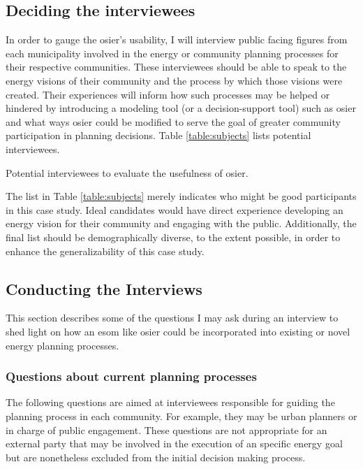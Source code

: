 \subsection{Deciding the interviewees}

In order to gauge the \ac{osier}'s usability, I will interview public facing
figures from each municipality involved in the energy or community planning
processes for their respective communities. These interviewees should be able to
speak to the energy visions of their community and the process by which those
visions were created. Their experiences will inform how such processes may be
helped or hindered by introducing a modeling tool (or a decision-support tool)
such as \ac{osier} and what ways \ac{osier} could be modified to serve the goal
of greater community participation in planning decisions. Table
\ref{table:subjects} lists potential interviewees.

\begin{table}[ht!]
    \centering
    \caption{Potential interviewees to evaluate the usefulness of \ac{osier}.}
    \resizebox*{0.8\textwidth}{!}{}
    \label{table:subjects}
\end{table}

The list in Table \ref{table:subjects} merely indicates who might be good
participants in this case study. Ideal candidates would have direct experience
developing an energy vision for their community and engaging with the public.
Additionally, the final list should be demographically diverse, to the extent
possible, in order to enhance the generalizability of this case study.

\subsection{Conducting the Interviews}

This section describes some of the questions I may ask during an interview to 
shed light on how an \ac{esom} like \ac{osier} could be incorporated into
existing or novel energy planning processes.

\subsubsection{Questions about current planning processes}
The following questions are aimed at interviewees responsible for guiding the
planning process in each community. For example, they may be urban planners or
in charge of public engagement. These questions are not appropriate for an
external party that may be involved in the execution of an specific energy goal
but are nonetheless excluded from the initial decision making process.

